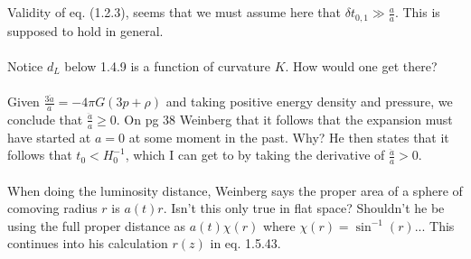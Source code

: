 \documentclass[10pt,letterpaper]{article}
\begin{document}
\\
\\
Validity of eq. (1.2.3), seems that we must assume here that $\delta t_{0,1} \gg \frac{a}{\dot a}$. This is supposed to hold in general.
\\ \\
Notice $d_L$ below 1.4.9 is a function of curvature $K$. How would one get there?\\ \\
Given $\frac{3\ddot a}{a} = -4\pi G(3p+\rho)$ and taking positive energy density and pressure, we conclude that $\frac{\ddot a}{a} \ge 0$. On pg 38 Weinberg that it follows that the expansion must have started at $a=0$ at some moment in the past. Why? He then states that it follows that $t_0 < H_0^{-1}$, which I can get to by taking the derivative of $\frac{\ddot a}{a} > 0$. 
\\ \\
When doing the luminosity distance, Weinberg says the proper area of a sphere of comoving radius $r$ is $a(t)r$. Isn't this only true in flat space? Shouldn't he be using the full proper distance as $a(t)\chi(r)$ where $\chi(r) = \sin^{-1}(r)..$. This continues into his calculation $r(z)$ in eq. 1.5.43. 
\end{document}
